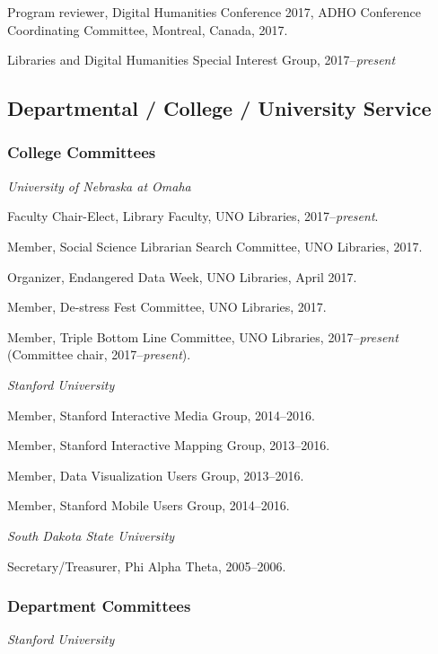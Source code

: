 Program reviewer, Digital Humanities Conference 2017, ADHO Conference
Coordinating Committee, Montreal, Canada, 2017.

Libraries and Digital Humanities Special Interest Group,
2017--\emph{present}

\subsection{Departmental / College / University
Service}\label{departmental-college-university-service}

\subsubsection{College Committees}\label{college-committees}

\emph{University of Nebraska at Omaha}

Faculty Chair-Elect, Library Faculty, UNO Libraries,
2017--\emph{present}.

Member, Social Science Librarian Search Committee, UNO Libraries, 2017.

Organizer, Endangered Data Week, UNO Libraries, April 2017.

Member, De-stress Fest Committee, UNO Libraries, 2017.

Member, Triple Bottom Line Committee, UNO Libraries,
2017--\emph{present} (Committee chair, 2017--\emph{present}).

\vspace{.4cm}

\emph{Stanford University}

Member, Stanford Interactive Media Group, 2014--2016.

Member, Stanford Interactive Mapping Group, 2013--2016.

Member, Data Visualization Users Group, 2013--2016.

Member, Stanford Mobile Users Group, 2014--2016.

\vspace{.4cm}

\emph{South Dakota State University}

Secretary/Treasurer, Phi Alpha Theta, 2005--2006.

\subsubsection{Department Committees}\label{department-committees}

\emph{Stanford University}

